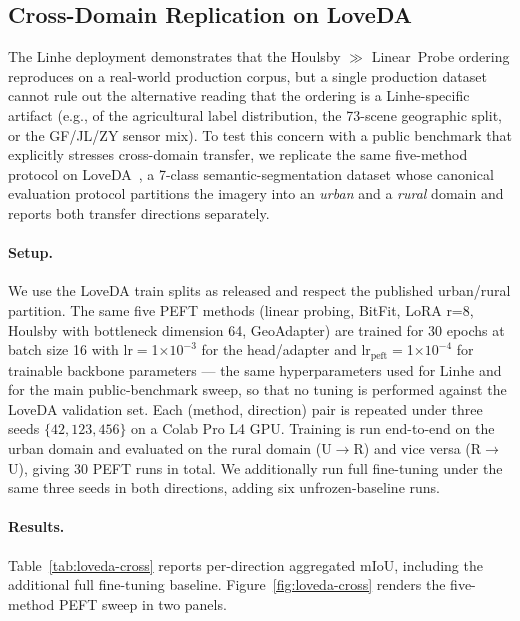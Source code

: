 \documentclass[11pt]{article}
\begin{document}
\subsection{Cross-Domain Replication on LoveDA}
\label{sec:loveda}

The Linhe deployment demonstrates that the Houlsby $\gg$ Linear~Probe ordering reproduces on a real-world production corpus, but a single production dataset cannot rule out the alternative reading that the ordering is a Linhe-specific artifact (e.g., of the agricultural label distribution, the 73-scene geographic split, or the GF/JL/ZY sensor mix). To test this concern with a public benchmark that explicitly stresses cross-domain transfer, we replicate the same five-method protocol on LoveDA~\cite{wang2021loveda}, a 7-class semantic-segmentation dataset whose canonical evaluation protocol partitions the imagery into an \emph{urban} and a \emph{rural} domain and reports both transfer directions separately.

\paragraph{Setup.} We use the LoveDA train splits as released and respect the published urban/rural partition. The same five PEFT methods (linear probing, BitFit, LoRA r=8, Houlsby with bottleneck dimension 64, GeoAdapter) are trained for 30 epochs at batch size 16 with lr$=$1$\times 10^{-3}$ for the head/adapter and lr$_{\mathrm{peft}}$$=$1$\times 10^{-4}$ for trainable backbone parameters --- the same hyperparameters used for Linhe and for the main public-benchmark sweep, so that no tuning is performed against the LoveDA validation set. Each (method, direction) pair is repeated under three seeds $\{42, 123, 456\}$ on a Colab Pro L4 GPU. Training is run end-to-end on the urban domain and evaluated on the rural domain (U$\rightarrow$R) and vice versa (R$\rightarrow$U), giving 30 PEFT runs in total. We additionally run full fine-tuning under the same three seeds in both directions, adding six unfrozen-baseline runs.

\paragraph{Results.} Table~\ref{tab:loveda-cross} reports per-direction aggregated mIoU, including the additional full fine-tuning baseline. Figure~\ref{fig:loveda-cross} renders the five-method PEFT sweep in two panels.
\end{document}
